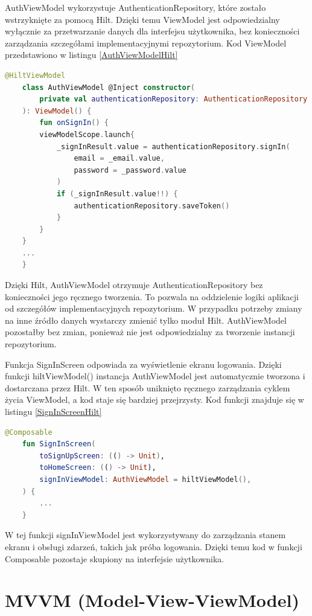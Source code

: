 \documentclass[12pt,twoside]{article}
\begin{document}
AuthViewModel wykorzystuje AuthenticationRepository, które zostało wstrzyknięte za pomocą Hilt. Dzięki temu ViewModel 
jest odpowiedzialny wyłącznie za przetwarzanie danych dla interfejsu użytkownika, bez konieczności zarządzania 
szczegółami implementacyjnymi repozytorium. Kod ViewModel przedstawiono w listingu \ref{AuthViewModelHilt}
\clearpage
\begin{lstlisting}[language=Kotlin,caption=Implementacja AuthViewModel, label={AuthViewModelHilt}]
	@HiltViewModel
	class AuthViewModel @Inject constructor(
		private val authenticationRepository: AuthenticationRepository
	): ViewModel() {
		fun onSignIn() {
        viewModelScope.launch{
            _signInResult.value = authenticationRepository.signIn(
                email = _email.value,
                password = _password.value
            )
            if (_signInResult.value!!) {
                authenticationRepository.saveToken()
            }
        }
    }
	... 
	}
\end{lstlisting}
Dzięki Hilt, AuthViewModel otrzymuje AuthenticationRepository bez konieczności jego ręcznego tworzenia. To pozwala 
na oddzielenie logiki aplikacji od szczegółów implementacyjnych repozytorium. W przypadku potrzeby zmiany na inne
źródło danych wystarczy zmienić tylko moduł Hilt. AuthViewModel pozostałby bez zmian, ponieważ nie jest odpowiedzialny 
za tworzenie instancji repozytorium.

Funkcja SignInScreen odpowiada za wyświetlenie ekranu logowania. Dzięki funkcji hiltViewModel() instancja 
AuthViewModel jest automatycznie tworzona i dostarczana przez Hilt. W ten sposób uniknięto ręcznego zarządzania 
cyklem życia ViewModel, a kod staje się bardziej przejrzysty. Kod funkcji znajduje się w listingu \ref{SignInScreenHilt}
\begin{lstlisting}[language=Kotlin,caption=Implementacja AuthViewModel, label={SignInScreenHilt}]
	@Composable
	fun SignInScreen(
		toSignUpScreen: (() -> Unit),
		toHomeScreen: (() -> Unit),
		signInViewModel: AuthViewModel = hiltViewModel(),
	) {
		...
	}
\end{lstlisting}
W tej funkcji signInViewModel jest wykorzystywany do zarządzania stanem ekranu i obsługi zdarzeń, takich jak próba 
logowania. Dzięki temu kod w funkcji Composable pozostaje skupiony na interfejsie użytkownika.

\clearpage

\section{MVVM (Model-View-ViewModel)}
\end{document}

